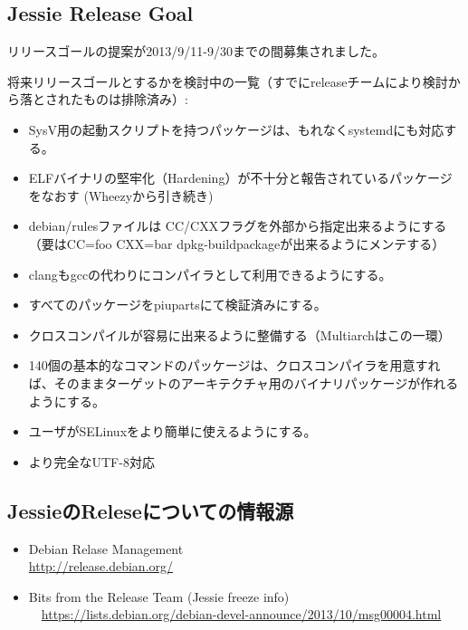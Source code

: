 \documentclass[mingoth,a4paper]{jsarticle}
\begin{document}

\subsection{Jessie Release Goal}

リリースゴールの提案が2013/9/11-9/30までの間募集されました。

将来リリースゴールとするかを検討中の一覧（すでにreleaseチームにより検討から落とされたものは排除済み）:\\
\begin{itemize}
\item SysV用の起動スクリプトを持つパッケージは、もれなくsystemdにも対応する。
\item ELFバイナリの堅牢化（Hardening）が不十分と報告されているパッケージをなおす (Wheezyから引き続き)
\item debian/rulesファイルは CC/CXXフラグを外部から指定出来るようにする
（要はCC=foo CXX=bar dpkg-buildpackageが出来るようにメンテする）
\item clangもgccの代わりにコンパイラとして利用できるようにする。
\end{itemize}

\begin{itemize}
\item すべてのパッケージをpiupartsにて検証済みにする。
\item クロスコンパイルが容易に出来るように整備する（Multiarchはこの一環）
\item 140個の基本的なコマンドのパッケージは、クロスコンパイラを用意すれば、そのままターゲットのアーキテクチャ用のバイナリパッケージが作れるようにする。
\item ユーザがSELinuxをより簡単に使えるようにする。
\item より完全なUTF-8対応
\end{itemize}

\subsection{JessieのReleseについての情報源}

 \begin{itemize}
 \item Debian Relase Management\\
  \url{http://release.debian.org/}
 \item  Bits from the Release Team (Jessie freeze info)\\
　\url{https://lists.debian.org/debian-devel-announce/2013/10/msg00004.html}
 \end{itemize}
\end{document}

